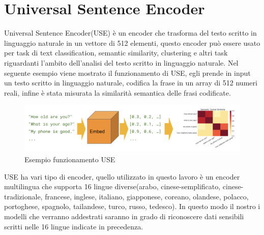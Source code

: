 \section{Universal Sentence Encoder}
Universal Sentence Encoder(USE) è un encoder che trasforma del testo scritto in linguaggio naturale in un vettore di 512 elementi, questo encoder può essere usato per task di text classification, semantic similarity, clustering e altri task riguardanti l'ambito dell'analisi del testo scritto in linguaggio naturale.\newline
Nel seguente esempio viene mostrato il funzionamento di USE, egli prende in input un testo scritto in linguaggio naturale, codifica la frase in un array di 512 numeri reali, infine è stata misurata la similarità semantica delle frasi codificate.
\begin{figure}[h]
    \centering
    \includegraphics [scale=0.4]{Figure/use.png}
    \caption{Esempio funzionamento USE}
    \label{fig:my_label}
\end{figure}
\FloatBarrier
USE ha vari tipo di encoder, quello utilizzato in questo lavoro è un encoder multilingua che supporta 16 lingue diverse(arabo, cinese-semplificato, cinese-tradizionale, francese, inglese, italiano, giapponese, coreano, olandese, polacco, portoghese, spagnolo, tailandese, turco, russo, tedesco). In questo modo il nostro i modelli che verranno addestrati saranno in grado di riconoscere dati sensibili scritti nelle 16 lingue indicate in precedenza.